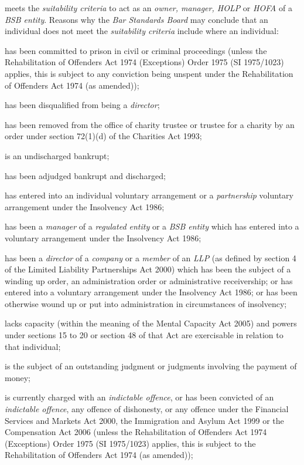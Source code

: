 meets the \emph{suitability criteria} to act as an \emph{owner, manager,
HOLP} or \emph{HOFA} of a \emph{BSB entity}. Reasons why the \emph{Bar
Standards Board} may conclude that an individual does not meet the
\emph{suitability criteria} include where an individual:
\item has been committed to prison in civil or criminal proceedings (unless
the Rehabilitation of Offenders Act 1974 (Exceptions) Order 1975 (SI
1975/1023) applies, this is subject to any conviction being unspent
under the Rehabilitation of Offenders Act 1974 (as amended));
\item has been disqualified from being a \emph{director};
\item has been removed from the office of charity trustee or trustee for a
charity by an order under section 72(1)(d) of the Charities Act 1993;
\item is an undischarged bankrupt;
\item has been adjudged bankrupt and discharged;
\item has entered into an individual voluntary arrangement or a
\emph{partnership} voluntary arrangement under the Insolvency Act 1986;
\item has been a \emph{manager} of a \emph{regulated entity} or a \emph{BSB
entity} which has entered into a voluntary arrangement under the
Insolvency Act 1986;
\item has been a \emph{director} of a \emph{company} or a \emph{member} of
an \emph{LLP} (as defined by section 4 of the Limited Liability
Partnerships Act 2000) which has been the subject of a winding up order,
an administration order or administrative receivership; or has entered
into a voluntary arrangement under the Insolvency Act 1986; or has been
otherwise wound up or put into administration in circumstances of
insolvency;
\item lacks capacity (within the meaning of the Mental Capacity Act 2005)
and powers under sections 15 to 20 or section 48 of that Act are
exercisable in relation to that individual;\item is the subject of an outstanding judgment or judgments involving the
payment of money;

\item is currently charged with an \emph{indictable offence}, or has been
convicted of an \emph{indictable offence}, any offence of dishonesty, or
any offence under the Financial Services and Markets Act 2000, the
Immigration and Asylum Act 1999 or the Compensation Act 2006 (unless the
Rehabilitation of Offenders Act 1974 (Exceptions) Order 1975 (SI
1975/1023) applies, this is subject to the Rehabilitation of Offenders
Act 1974 (as amended));

